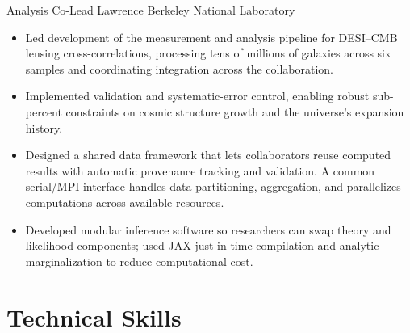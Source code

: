 \documentclass[11pt,a4paper,sans]{moderncv}
\newcommand{\placeholder}[1]{%
  \textcolor{gray}{\emph{[FILL IN: #1]}}%
}
\begin{document}
  {Analysis Co-Lead}
  {Lawrence Berkeley National Laboratory}
  {}
  {}
  {\begin{itemize}
    \item Led development of the measurement and analysis pipeline for DESI–CMB lensing cross-correlations, processing tens of millions of galaxies across six samples and coordinating integration across the collaboration.
    \item Implemented validation and systematic-error control, enabling robust sub-percent constraints on cosmic structure growth and the universe's expansion history.
    \item Designed a shared data framework that lets collaborators reuse computed results with automatic provenance tracking and validation. A common serial/MPI interface handles data partitioning, aggregation, and parallelizes computations across available resources.
    \item Developed modular inference software so researchers can swap theory and likelihood components; used JAX just-in-time compilation and analytic marginalization to reduce computational cost.
  \end{itemize}}

\section{Technical Skills}

%
\end{document}
